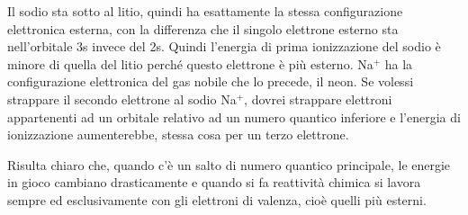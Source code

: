 Il sodio sta sotto al litio, quindi ha esattamente la stessa configurazione elettronica esterna, con la differenza che il singolo elettrone esterno sta nell'orbitale 3s invece del 2s. Quindi l'energia di prima ionizzazione del sodio è minore di quella del litio perché questo elettrone è più esterno. Na$^+$ ha la configurazione elettronica del gas nobile che lo precede, il neon. Se volessi strappare il secondo elettrone al sodio Na$^+$, dovrei strappare elettroni appartenenti ad un orbitale relativo ad un numero quantico inferiore e l'energia di ionizzazione aumenterebbe, stessa cosa per un terzo elettrone. 

Risulta chiaro che, quando c'è un salto di numero quantico principale, le energie in gioco cambiano drasticamente e quando si fa reattività chimica si lavora sempre ed esclusivamente con gli elettroni di valenza, cioè quelli più esterni.\\

